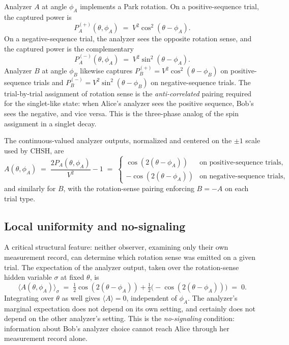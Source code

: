 \documentclass[
  11pt]{article}
\begin{document}
Analyzer \(A\) at angle \(\phi_A\) implements a Park rotation. On a
positive-sequence trial, the captured power is \[
P_A^{(+)}(\theta, \phi_A) \;=\; V^2 \cos^2(\theta - \phi_A).
\] On a negative-sequence trial, the analyzer sees the opposite rotation
sense, and the captured power is the complementary \[
P_A^{(-)}(\theta, \phi_A) \;=\; V^2 \sin^2(\theta - \phi_A).
\] Analyzer \(B\) at angle \(\phi_B\) likewise captures
\(P_B^{(+)} = V^2\cos^2(\theta - \phi_B)\) on positive-sequence trials
and \(P_B^{(-)} = V^2\sin^2(\theta - \phi_B)\) on negative-sequence
trials. The trial-by-trial assignment of rotation sense is the
\emph{anti-correlated} pairing required for the singlet-like state: when
Alice's analyzer sees the positive sequence, Bob's sees the negative,
and vice versa. This is the three-phase analog of the spin assignment in
a singlet decay.

The continuous-valued analyzer outputs, normalized and centered on the
\(\pm 1\) scale used by CHSH, are \[
A(\theta, \phi_A) \;=\; \frac{2 P_A(\theta, \phi_A)}{V^2} - 1 \;=\; \begin{cases} \cos(2(\theta - \phi_A)) & \text{on positive-sequence trials,} \\ -\cos(2(\theta - \phi_A)) & \text{on negative-sequence trials,} \end{cases}
\] and similarly for \(B\), with the rotation-sense pairing enforcing
\(B = -A\) on each trial type.

\subsection{Local uniformity and
no-signaling}\label{local-uniformity-and-no-signaling}

A critical structural feature: neither observer, examining only their
own measurement record, can determine which rotation sense was emitted
on a given trial. The expectation of the analyzer output, taken over the
rotation-sense hidden variable \(\sigma\) at fixed \(\theta\), is \[
\langle A(\theta, \phi_A) \rangle_\sigma \;=\; \tfrac{1}{2}\cos(2(\theta - \phi_A)) + \tfrac{1}{2}\big(\!-\!\cos(2(\theta - \phi_A))\big) \;=\; 0.
\] Integrating over \(\theta\) as well gives \(\langle A \rangle = 0\),
independent of \(\phi_A\). The analyzer's marginal expectation does not
depend on its own setting, and certainly does not depend on the other
analyzer's setting. This is the \emph{no-signaling} condition:
information about Bob's analyzer choice cannot reach Alice through her
measurement record alone.
\end{document}
